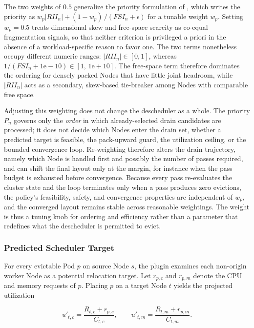 The two weights of \(0.5\) generalize the priority formulation of \cite{guo2025joint}, which writes the priority as \(w_p\left|RII_n\right| + (1-w_p)\,/(FSI_n+\epsilon)\) for a tunable weight \(w_p\). Setting \(w_p = 0.5\) treats dimensional skew and free-space scarcity as co-equal fragmentation signals, so that neither criterion is privileged a priori in the absence of a workload-specific reason to favor one. The two terms nonetheless occupy different numeric ranges: \(\left|RII_n\right| \in [0,1]\), whereas \(1/(FSI_n+1\mathrm{e}{-}10) \in [1,\,1\mathrm{e}{+}10]\). The free-space term therefore dominates the ordering for densely packed Nodes that have little joint headroom, while \(\left|RII_n\right|\) acts as a secondary, skew-based tie-breaker among Nodes with comparable free space.

Adjusting this weighting does not change the descheduler as a whole. The priority \(P_n\) governs only the \emph{order} in which already-selected drain candidates are processed; it does not decide which Nodes enter the drain set, whether a predicted target is feasible, the pack-upward guard, the utilization ceiling, or the bounded convergence loop. Re-weighting therefore alters the drain trajectory, namely which Node is handled first and possibly the number of passes required, and can shift the final layout only at the margin, for instance when the pass budget is exhausted before convergence. Because every pass re-evaluates the cluster state and the loop terminates only when a pass produces zero evictions, the policy's feasibility, safety, and convergence properties are independent of \(w_p\), and the converged layout remains stable across reasonable weightings. The weight is thus a tuning knob for ordering and efficiency rather than a parameter that redefines what the descheduler is permitted to evict.

\subsubsection{Predicted Scheduler Target}
\label{sec:defrag_target_prediction}

For every evictable Pod \(p\) on source Node \(s\), the plugin examines each non-origin worker Node as a potential relocation target. Let \(r_{p,c}\) and \(r_{p,m}\) denote the CPU and memory requests of \(p\). Placing \(p\) on a target Node \(t\) yields the projected utilization

\[
    u'_{t,c} = \frac{R_{t,c} + r_{p,c}}{C_{t,c}},
    \qquad
    u'_{t,m} = \frac{R_{t,m} + r_{p,m}}{C_{t,m}}.
\]


